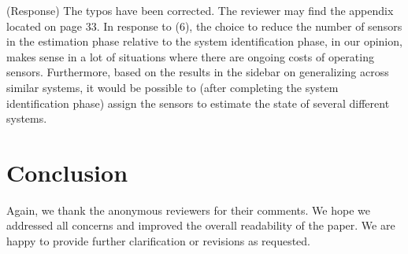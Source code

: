 \documentclass{letter}
\begin{document}
{\color{red}(Response)} The typos have been corrected. The reviewer may find the appendix located on page 33. In response to (6), the choice to reduce the number of sensors in the estimation phase relative to the system identification phase, in our opinion, makes sense in a lot of situations where there are ongoing costs of operating sensors. Furthermore, based on the results in the sidebar on generalizing across similar systems, it would be possible to (after completing the system identification phase) assign the sensors to estimate the state of several different systems.

\section{Conclusion}

Again, we thank the anonymous reviewers for their comments. We hope we 
addressed all concerns and improved the overall readability of the paper. We are happy to provide further clarification or revisions as requested.





\small
%


\end{document}
